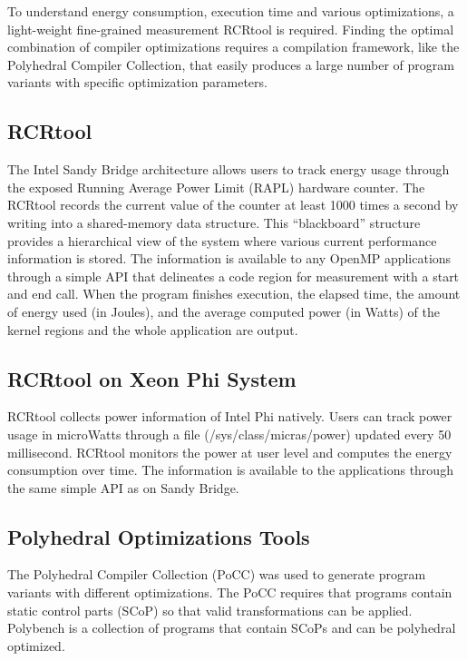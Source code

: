 To understand energy consumption, execution time and various optimizations,
a light-weight fine-grained measurement RCRtool is required. 
Finding the optimal combination of compiler optimizations 
requires a compilation framework, like the Polyhedral Compiler
Collection, that easily produces a large number of 
program variants with specific optimization parameters.
\subsection{RCRtool}
The Intel Sandy Bridge architecture allows users to track energy usage through 
the exposed Running Average Power Limit (RAPL) hardware counter. 
The RCRtool records the current value of the counter at least 1000 times a second by writing 
into a shared-memory data structure. This ``blackboard'' structure provides a hierarchical view of the system
where various current performance information is stored. The 
information is available to any OpenMP applications through a simple API that 
delineates a code region for measurement with a start and end call.
When the program finishes execution,
the elapsed time, the amount of energy used (in Joules), and the average computed
power (in Watts) of the kernel regions and the whole application are output. 
\subsection{RCRtool on Xeon Phi System}
RCRtool collects power information of Intel Phi natively. 
Users can track power usage in microWatts through    
a file (/sys/class/micras/power) updated every 50 millisecond.
RCRtool monitors the power at user level and computes the energy
consumption over time.
The information is available to the applications through the same simple API as on
Sandy Bridge.
\subsection{Polyhedral Optimizations Tools}
The Polyhedral Compiler Collection (PoCC) was used to generate program 
variants with different optimizations.
The PoCC requires that programs contain static control parts (SCoP) so that 
valid transformations can be applied. Polybench is a collection of programs
that contain SCoPs and can be polyhedral optimized.  
